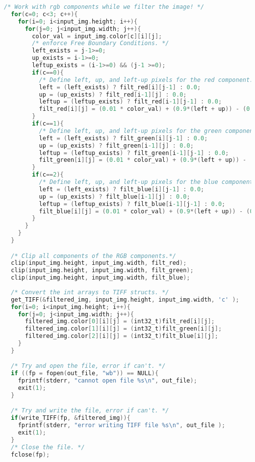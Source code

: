 \documentclass{article}
\begin{document}
\begin{lstlisting}[language=C, caption=filter\_image\_section5.c, label={lst:sec5}]
  /* Work with rgb components while we filter the image! */
  for(c=0; c<3; c++){
    for(i=0; i<input_img.height; i++){
      for(j=0; j<input_img.width; j++){
        color_val = input_img.color[c][i][j];
        /* enforce Free Boundary Conditions. */
        left_exists = j-1>=0;
        up_exists = i-1>=0;
        leftup_exists = (i-1>=0) && (j-1 >=0);
        if(c==0){
          /* Define left, up, and left-up pixels for the red component. */
          left = (left_exists) ? filt_red[i][j-1] : 0.0;
          up = (up_exists) ? filt_red[i-1][j] : 0.0;
          leftup = (leftup_exists) ? filt_red[i-1][j-1] : 0.0;
          filt_red[i][j] = (0.01 * color_val) + (0.9*(left + up)) - (0.81 * leftup);
        }
        if(c==1){
          /* Define left, up, and left-up pixels for the green component. */
          left = (left_exists) ? filt_green[i][j-1] : 0.0;
          up = (up_exists) ? filt_green[i-1][j] : 0.0;
          leftup = (leftup_exists) ? filt_green[i-1][j-1] : 0.0;
          filt_green[i][j] = (0.01 * color_val) + (0.9*(left + up)) - (0.81 * leftup);
        }
        if(c==2){
          /* Define left, up, and left-up pixels for the blue component. */
          left = (left_exists) ? filt_blue[i][j-1] : 0.0;
          up = (up_exists) ? filt_blue[i-1][j] : 0.0;
          leftup = (leftup_exists) ? filt_blue[i-1][j-1] : 0.0;
          filt_blue[i][j] = (0.01 * color_val) + (0.9*(left + up)) - (0.81 * leftup);
        }
      }
    }
  }

  /* Clip all components of the RGB components.*/
  clip(input_img.height, input_img.width, filt_red);
  clip(input_img.height, input_img.width, filt_green);
  clip(input_img.height, input_img.width, filt_blue);
  
  /* Convert the int arrays to TIFF structs. */
  get_TIFF(&filtered_img, input_img.height, input_img.width, 'c' );
  for(i=0; i<input_img.height; i++){
    for(j=0; j<input_img.width; j++){
      filtered_img.color[0][i][j] = (int32_t)filt_red[i][j];
      filtered_img.color[1][i][j] = (int32_t)filt_green[i][j];
      filtered_img.color[2][i][j] = (int32_t)filt_blue[i][j];
    }
  }

  /* Try and open the file, error if can't. */
  if ((fp = fopen(out_file, "wb")) == NULL){
    fprintf(stderr, "cannot open file %s\n", out_file);
    exit(1);
  }

  /* Try and write the file, error if can't. */
  if(write_TIFF(fp, &filtered_img)){
    fprintf(stderr, "error writing TIFF file %s\n", out_file );
    exit(1);
  }
  /* Close the file. */
  fclose(fp);


\end{lstlisting}
\end{document}

